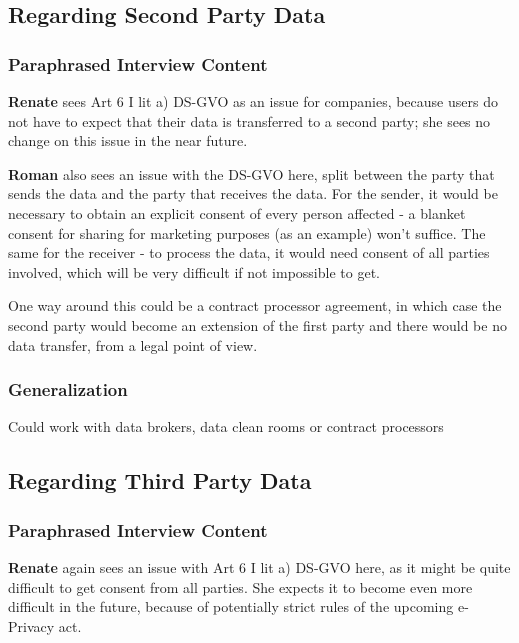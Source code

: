 \subsection{Regarding Second Party Data}

\subsubsection{Paraphrased Interview Content}

\textbf{Renate} sees Art 6 I lit a) DS-GVO as an issue for companies, because users do not have to expect that their data is transferred to a second party; she sees no change on this issue in the near future.

\textbf{Roman} also sees an issue with the DS-GVO here, split between the party that sends the data and the party that receives the data. For the sender, it would be necessary to obtain an explicit consent of every person affected - a blanket consent for sharing for marketing purposes (as an example) won't suffice. The same for the receiver - to process the data, it would need consent of all parties involved, which will be very difficult if not impossible to get.

One way around this could be a contract processor agreement, in which case the second party would become an extension of the first party and there would be no data transfer, from a legal point of view.

\subsubsection{Generalization}

Could work with data brokers, data clean rooms or contract processors

\subsection{Regarding Third Party Data}

\subsubsection{Paraphrased Interview Content}

\textbf{Renate} again sees an issue with Art 6 I lit a) DS-GVO here, as it might be quite difficult to get consent from all parties. She expects it to become even more difficult in the future, because of potentially strict rules of the upcoming e-Privacy act.

